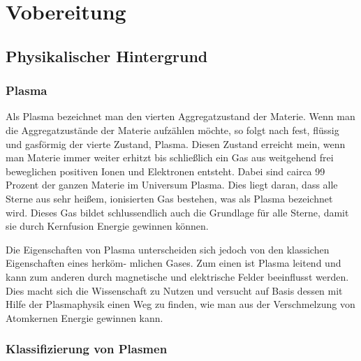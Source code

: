 \documentclass{article}
\begin{document}
\newpage

\section{Vobereitung}

\subsection{Physikalischer Hintergrund}

\subsubsection{Plasma}

\cite[1356]{Physik}

\cite{MPG}

Als Plasma bezeichnet man den vierten Aggregatzustand der Materie. Wenn man die Aggregatzustände der Materie aufzählen möchte, so folgt nach fest, flüssig und gasförmig der vierte Zustand, Plasma. Diesen Zustand erreicht mein, wenn man Materie immer weiter erhitzt bis schließlich ein Gas aus weitgehend frei beweglichen positiven Ionen und Elektronen entsteht. Dabei sind cairca 99 Prozent der ganzen Materie im Universum Plasma. Dies liegt daran, dass alle Sterne aus sehr heißem, ionisierten Gas bestehen, was als Plasma bezeichnet wird. Dieses Gas bildet schlussendlich auch die Grundlage für alle Sterne, damit sie durch Kernfusion Energie gewinnen können. 

Die Eigenschaften von Plasma unterscheiden sich jedoch von den klassichen Eigenschaften eines herköm- mlichen Gases. Zum einen ist Plasma leitend und kann zum anderen durch magnetische und elektrische Felder beeinflusst werden. Dies macht sich die Wissenschaft zu Nutzen und versucht auf Basis dessen mit Hilfe der Plasmaphysik einen Weg zu finden, wie man aus der Verschmelzung von Atomkernen Energie gewinnen kann. 

\subsubsection{Klassifizierung von Plasmen}

\cite[15--20]{Pp} 

\cite[14--16]{EidPp} 

\cite{PMT}
\end{document}
